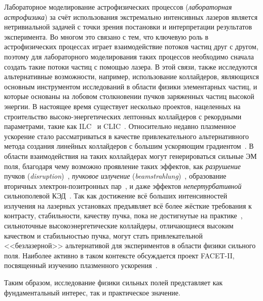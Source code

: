 Лабораторное моделирование астрофизических процессов (\textit{лабораторная астрофизика}) за счёт использования экстремально интенсивных лазеров является нетривиальной задачей с точки зрения постановки и интерпретации результатов эксперимента.
Во многом это связано с тем, что ключевую роль в астрофизических процессах играет взаимодействие потоков частиц друг с другом, поэтому для лабораторного моделирования таких процессов необходимо сначала создать такие потоки частиц с помощью лазера.
В этой связи, также исследуются альтернативные возможности, например, использование коллайдеров, являющихся основным инструментом исследований в области физики элементарных частиц, и которые основаны на лобовом столкновении пучков заряженных частиц высокой энергии.
В настоящее время существует несколько проектов, нацеленных на строительство высоко-энергетических лептонных коллайдеров с рекордными параметрами, такие как ILC~\cite{ILC} и CLIC~\cite{CLIC}.
Относительно недавно плазменное ускорение стало рассматриваться в качестве привлекательного альтернативного метода создания линейных коллайдеров с большим ускоряющим градиентом~\cite{schroeder2010physics}.
В области взаимодействия на таких коллайдерах могут генерироваться сильные ЭМ поля, благодаря чему возможно проявление таких эффектов, как \textit{разрушение} пучков (\textit{disruption})~\cite{hollebeek1981disruption,yokoya1992beam,chen1988disruption}, \textit{пучковое излучение} (\textit{beamstrahlung})~\cite{noble1987beamstrahlung,blankenbecler1987quantum,bell1995quantum}, образование вторичных электрон-позитронных пар~\cite{chen1989coherent,esberg2014strong}, и даже эффектов \textit{непертурбативной} сильнополевой КЭД~\cite{yakimenko2019prospect,tamburini2020efficient}.
Так как достижение всё больших интенсивностей излучения на лазерных установках предъявляет всё более жёсткие требования к контрасту, стабильности, качеству пучка, пока не достигнутые на практике~\cite{danson2019petawatt}, сильноточные высокоэнергетические коллайдеры, отличающиеся высоким качеством и стабильностью пучка, могут стать привлекательной <<безлазерной>> альтернативой для экспериментов в области физики сильного поля.
Наиболее активно в таком контексте обсуждается проект FACET-II, посвященный изучению плазменного ускорения~\cite{FACET, yakimenko2019prospect, del2019bright, meuren2019probing}.

Таким образом, исследование физики сильных полей представляет как фундаментальный интерес, так и практическое значение.


